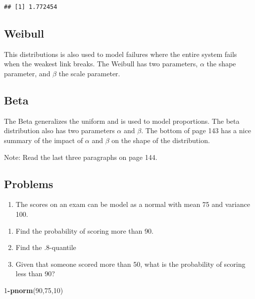 \documentclass[]{book}
\newenvironment{Shaded}{\begin{snugshade}}{\end{snugshade}}
\newcommand{\KeywordTok}[1]{\textcolor[rgb]{0.13,0.29,0.53}{\textbf{#1}}}
\newcommand{\DecValTok}[1]{\textcolor[rgb]{0.00,0.00,0.81}{#1}}
\newcommand{\OperatorTok}[1]{\textcolor[rgb]{0.81,0.36,0.00}{\textbf{#1}}}
\newcommand{\NormalTok}[1]{#1}
\providecommand{\tightlist}{%
  \setlength{\itemsep}{0pt}\setlength{\parskip}{0pt}}
\theoremstyle{definition}
\theoremstyle{definition}
\theoremstyle{definition}
\theoremstyle{remark}
\begin{document}
\begin{verbatim}
## [1] 1.772454
\end{verbatim}

\subsection{Weibull}\label{weibull}

This distributions is also used to model failures where the entire
system fails when the weakest link breaks. The Weibull has two
parameters, \(\alpha\) the shape parameter, and \(\beta\) the scale
parameter.

\subsection{Beta}\label{beta}

The Beta generalizes the uniform and is used to model proportions. The
beta distribution also has two parameters \(\alpha\) and \(\beta\). The
bottom of page 143 has a nice summary of the impact of \(\alpha\) and
\(\beta\) on the shape of the distribution.

Note: Read the last three paragraphs on page 144.

\subsection{Problems}\label{problems-1}

\begin{enumerate}
\def\labelenumi{\arabic{enumi})}
\tightlist
\item
  The scores on an exam can be model as a normal with mean 75 and
  variance 100.
\end{enumerate}

\begin{enumerate}
\def\labelenumi{\alph{enumi})}
\tightlist
\item
  Find the probability of scoring more than 90.
\item
  Find the .8-quantile
\item
  Given that someone scored more than 50, what is the probability of
  scoring less than 90?
\end{enumerate}

\begin{Shaded}
\begin{Highlighting}[]
\DecValTok{1}\OperatorTok{-}\KeywordTok{pnorm}\NormalTok{(}\DecValTok{90}\NormalTok{,}\DecValTok{75}\NormalTok{,}\DecValTok{10}\NormalTok{)}
\end{Highlighting}
\end{Shaded}
\end{document}
